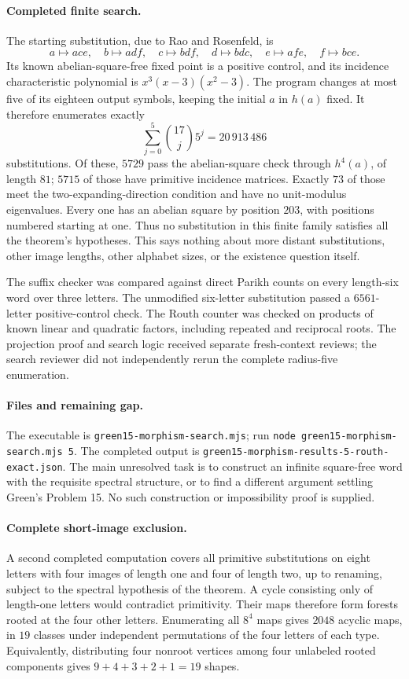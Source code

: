 \documentclass[11pt]{article}
\begin{document}
\paragraph{Completed finite search.}
The starting substitution, due to Rao and Rosenfeld, is
\[
 a\mapsto ace,\quad b\mapsto adf,\quad c\mapsto bdf,\quad
 d\mapsto bdc,\quad e\mapsto afe,\quad f\mapsto bce.
\]
Its known abelian-square-free fixed point is a positive control, and its
incidence characteristic polynomial is $x^3(x-3)(x^2-3)$.
The program changes at most five of its eighteen output symbols, keeping
the initial $a$ in $h(a)$ fixed. It therefore enumerates exactly
\[
 \sum_{j=0}^{5}\binom{17}{j}5^j=20\,913\,486
\]
substitutions. Of these, $5729$ pass the abelian-square check through
$h^4(a)$, of length $81$; $5715$ of those have primitive incidence matrices.
Exactly $73$ of those meet the two-expanding-direction condition and have no
unit-modulus eigenvalues. Every one has an abelian square by position $203$,
with positions numbered starting at one. Thus no substitution in this finite
family satisfies all the theorem's hypotheses. This says nothing about more
distant substitutions, other image lengths, other alphabet sizes, or the
existence question itself.

The suffix checker was compared against direct Parikh counts on every
length-six word over three letters. The unmodified six-letter substitution
passed a $6561$-letter positive-control check. The Routh counter was checked
on products of known linear and quadratic factors, including repeated and
reciprocal roots. The projection proof and search logic received separate
fresh-context reviews; the search reviewer did not independently rerun the
complete radius-five enumeration.

\paragraph{Files and remaining gap.}
The executable is \texttt{green15-morphism-search.mjs}; run
\texttt{node green15-morphism-search.mjs 5}.
The completed output is \texttt{green15-morphism-results-5-routh-exact.json}.
The main unresolved task is to construct an infinite square-free word with
the requisite spectral structure, or to find a different argument settling
Green's Problem 15. No such construction or impossibility proof is supplied.

\paragraph{Complete short-image exclusion.}
A second completed computation covers all primitive substitutions on eight
letters with four images of length one and four of length two, up to renaming,
subject to the spectral hypothesis of the theorem. A cycle consisting only of
length-one letters would contradict primitivity. Their maps therefore form
forests rooted at the four other letters. Enumerating all $8^4$ maps gives
$2048$ acyclic maps, in $19$ classes under independent permutations of the
four letters of each type. Equivalently, distributing four nonroot vertices
among four unlabeled rooted components gives $9+4+3+2+1=19$ shapes.
\end{document}
